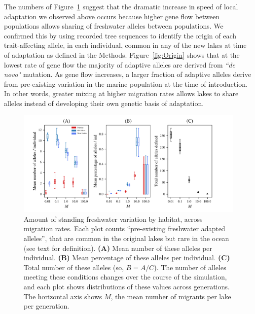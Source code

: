 \documentclass{article}
\begin{document}
The numbers of Figure~\ref{fig:MPFAI} suggest that
the dramatic increase in speed of local adaptation we observed above occurs because
higher gene flow between populations allows sharing of freshwater alleles between populations.
We confirmed this by using recorded tree sequences to identify the origin of each trait-affecting
allele, in each individual, common in any of the new lakes at time of adaptation
as defined in the Methods.
Figure~\ref{fig:Origin} shows that at the lowest rate of gene flow the majority of adaptive alleles are derived from \emph{``de novo"} mutation.
As gene flow increases, a larger fraction of adaptive alleles 
derive from pre-existing variation in the marine population at the time of introduction.
In other words, 
greater mixing at higher migration rates allows lakes to share alleles
instead of developing their own genetic basis of adaptation.

\begin{figure}
	\begin{center}
  		\includegraphics{Final_Plots/Freshwater_Alleles.pdf}
  		\caption{
            Amount of standing freshwater variation by habitat, across migration rates.
            Each plot counts ``pre-existing freshwater adapted alleles'',
            that are common in the original lakes but rare in the ocean
            (see text for definition).
            \textbf{(A)} Mean number of these alleles per individual.
            \textbf{(B)} Mean percentage of these alleles per individual.
            \textbf{(C)} Total number of these alleles (so, $B = A/C$).
            The number of alleles meeting these conditions changes over the course of the simulation,
            and each plot shows distributions of these values across generations.
            The horizontal axis shows $M$, the mean number of migrants per lake per generation.
		}
		\label{fig:MPFAI}
	\end{center}
\end{figure}
\end{document}
